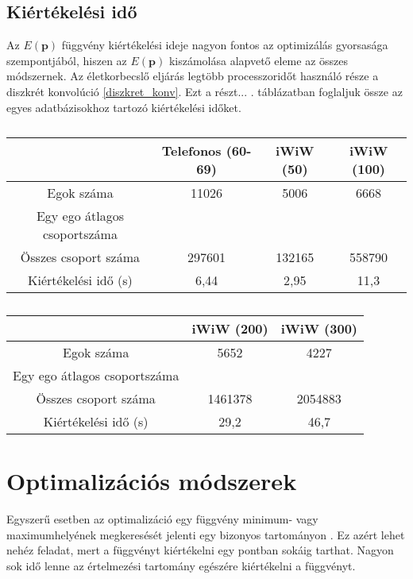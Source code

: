 \documentclass[12pt]{article}
\begin{document}
\subsection{Kiértékelési idő}
Az $E(\mathbf{p})$ függvény kiértékelési ideje nagyon fontos az optimizálás gyorsasága szempontjából, hiszen az $E(\mathbf{p})$ kiszámolása alapvető eleme az összes módszernek. Az életkorbecslő eljárás legtöbb processzoridőt használó része a diszkrét konvolúció \eqref{diszkret_konv}. Ezt a részt... %
. táblázatban foglaljuk össze az egyes adatbázisokhoz tartozó kiértékelési időket.
\begin{table}[H]
	\centering
	\begin{subtable}{1.0\textwidth}
		\centering
		\begin{tabular}{|c|c|c|c|}
			\hline
			& Telefonos (60-69) & iWiW (50) & iWiW (100)  \\
			\hline
			Egok száma & 11026 & 5006 & 6668 \\
			\hline
			Egy ego átlagos csoportszáma & & & \\
			\hline
			Összes csoport száma & 297601 & 132165 & 558790 \\
			\hline
			Kiértékelési idő (s) & 6,44 & 2,95 & 11,3\\
			\hline
		\end{tabular}
		\caption{}
		\label{}
	\end{subtable}
	
	\begin{subtable}{1.0\textwidth}
		\centering
		\begin{tabular}{|c|c|c|}
			\hline
			& iWiW (200) & iWiW (300)  \\
			\hline
			Egok száma & 5652 & 4227 \\
			\hline
			Egy ego átlagos csoportszáma & & \\
			\hline
			Összes csoport száma & 1461378 & 2054883 \\
			\hline
			Kiértékelési idő (s) & 29,2 & 46,7 \\
			\hline
		\end{tabular}
		\caption{}
		\label{}
	\end{subtable}
	\caption{}
	\label{csoport_kiertekeles}
\end{table}

\section{Optimalizációs módszerek}
Egyszerű esetben az optimalizáció egy függvény minimum- vagy maximumhelyének megkeresését jelenti egy bizonyos tartományon \cite{Holder}. \iffalse TODO: példa a prog opt.-ról? \fi Ez azért lehet nehéz feladat, mert a függvényt kiértékelni egy pontban sokáig tarthat. Nagyon sok idő lenne az értelmezési tartomány egészére kiértékelni a függvényt.
\end{document}
